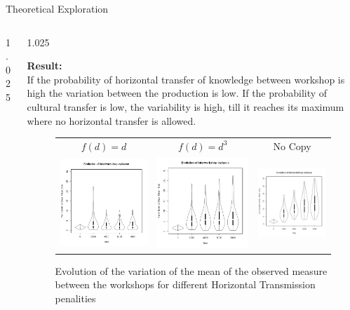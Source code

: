 \documentclass[final]{beamer}
\newlength{\sepwid}
\newlength{\onecolwid}
\newlength{\twocolwid}
\begin{document}
\begin{frame}[t]
\begin{columns}[t]
\begin{column}{\twocolwid}
\begin{block}{Theoretical Exploration}
\begin{columns}[t,totalwidth=\twocolwid]
\begin{column}{1.025\onecolwid}
\end{column}


\begin{column}{1.025\onecolwid} %
\justify

{\textbf{Result:}}\\
If the probability of horizontal transfer of knowledge between workshop is high the variation between the production is low. If the probability of cultural transfer is low, the variability is high, till it reaches its maximum where no horizontal transfer is allowed.

    \begin{figure}[h!]
    \centering
	\caption{Evolution of the variation of the mean of the observed measure between the workshops for different Horizontal Transmission penalities}
    \begin{tabular}{ccc}
	     $f(d)=d$ & $f(d)=d^3$ & No Copy\\
	    
	    \includegraphics[height=.3\textwidth]{images/lineC.png}
	    &
	    \includegraphics[height=.3\textwidth]{images/cubeC.png}
	    &
	    \includegraphics[height=.3\textwidth]{images/lineNC.png}\\
	\end{tabular}
	\label{fig:resmod}
    \end{figure}



\end{column}
\end{columns}
\end{block}
\end{column}
\end{columns}
\end{frame}
\end{document}
